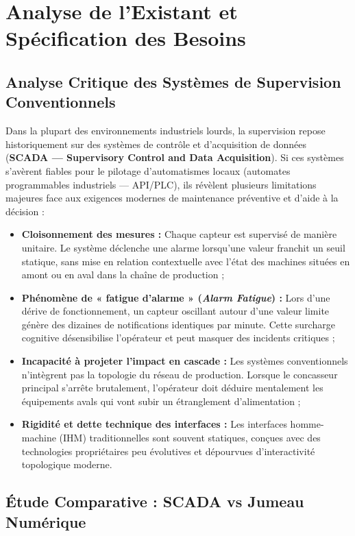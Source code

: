 ﻿\chapter{Analyse de l'Existant et Spécification des Besoins}

\section{Analyse Critique des Systèmes de Supervision Conventionnels}

Dans la plupart des environnements industriels lourds, la supervision repose historiquement sur des systèmes de contrôle et d'acquisition de données (\textbf{SCADA --- Supervisory Control and Data Acquisition}). Si ces systèmes s'avèrent fiables pour le pilotage d'automatismes locaux (automates programmables industriels --- API/PLC), ils révèlent plusieurs limitations majeures face aux exigences modernes de maintenance préventive et d'aide à la décision :

\begin{itemize}
    \item \textbf{Cloisonnement des mesures :} Chaque capteur est supervisé de manière unitaire. Le système déclenche une alarme lorsqu'une valeur franchit un seuil statique, sans mise en relation contextuelle avec l'état des machines situées en amont ou en aval dans la chaîne de production ;
    \item \textbf{Phénomène de « fatigue d'alarme » (\textit{Alarm Fatigue}) :} Lors d'une dérive de fonctionnement, un capteur oscillant autour d'une valeur limite génère des dizaines de notifications identiques par minute. Cette surcharge cognitive désensibilise l'opérateur et peut masquer des incidents critiques ;
    \item \textbf{Incapacité à projeter l'impact en cascade :} Les systèmes conventionnels n'intègrent pas la topologie du réseau de production. Lorsque le concasseur principal s'arrête brutalement, l'opérateur doit déduire mentalement les équipements avals qui vont subir un étranglement d'alimentation ;
    \item \textbf{Rigidité et dette technique des interfaces :} Les interfaces homme-machine (IHM) traditionnelles sont souvent statiques, conçues avec des technologies propriétaires peu évolutives et dépourvues d'interactivité topologique moderne.
\end{itemize}

\section{Étude Comparative : SCADA vs Jumeau Numérique}

